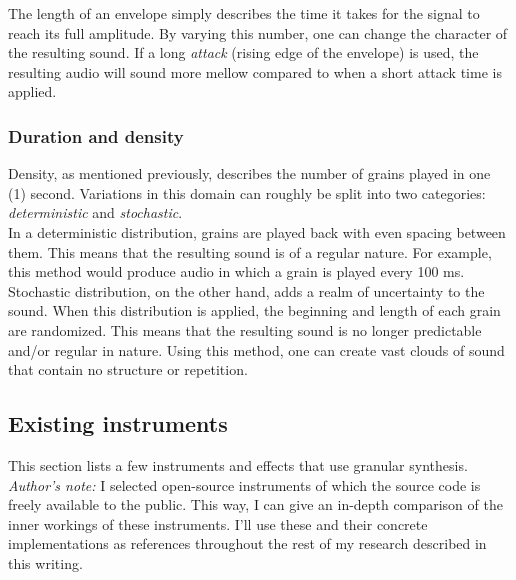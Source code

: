 \documentclass[10pt, twocolumn]{IEEEtran}
\begin{document}
The length of an envelope simply describes the time it takes for the signal to reach its full amplitude. By varying this number, one can change the character of the resulting sound. If a long \textit{attack} (rising edge of the envelope) is used, the resulting audio will sound more mellow compared to when a short attack time is applied.

\subsubsection{Duration and density}
Density, as mentioned previously, describes the number of grains played in one (1) second. Variations in this domain can roughly be split into two categories: \textit{deterministic} and \textit{stochastic}.\\
In a deterministic distribution, grains are played back with even spacing between them. This means that the resulting sound is of a regular nature. For example, this method would produce audio in which a grain is played every 100 ms. \\
Stochastic distribution, on the other hand, adds a realm of uncertainty to the sound. When this distribution is applied, the beginning and length of each grain are randomized. This means that the resulting sound is no longer predictable and/or regular in nature. Using this method, one can create vast clouds of sound that contain no structure or repetition.

\subsection{Existing instruments}
This section lists a few instruments and effects that use granular synthesis. \\
\textit{Author's note:} I selected open-source instruments of which the source code is freely available to the public. This way, I can give an in-depth comparison of the inner workings of these instruments. I'll use these and their concrete implementations as references throughout the rest of my research described in this writing.
\end{document}
